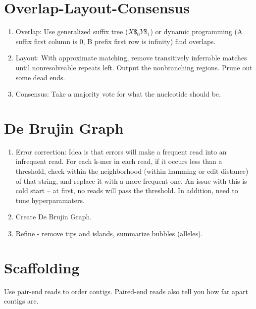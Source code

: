 \documentclass{article}
\begin{document}
\section{Overlap-Layout-Consensus}
\begin{enumerate}
    \item Overlap: Use generalized suffix tree ($X\$_0Y\$_1$) or dynamic programming (A suffix first column is 0, B prefix first row is infinity) find overlaps.
    \item Layout: With approximate matching, remove transitively inferrable matches until nonresolveable repeats left. Output the nonbranching regions. Prune out some dead ends.
    \item Consensus: Take a majority vote for what the nucleotide should be.
\end{enumerate}

\section{De Brujin Graph}
\begin{enumerate}
    \item Error correction: Idea is that errors will make a frequent read into an infrequent read. For each k-mer in each read, if it occurs less than a threshold, check within the neighborhood (within hamming or edit distance) of that string, and replace it with a more frequent one. An issue with this is cold start -- at first, no reads will pass the threshold. In addition, need to tune hyperparamaters.
    \item Create De Brujin Graph.
    \item Refine - remove tips and islands, summarize bubbles (alleles).
\end{enumerate}

\section{Scaffolding}
Use pair-end reads to order contigs. Paired-end reads also tell you how far apart contigs are.
\end{document}
